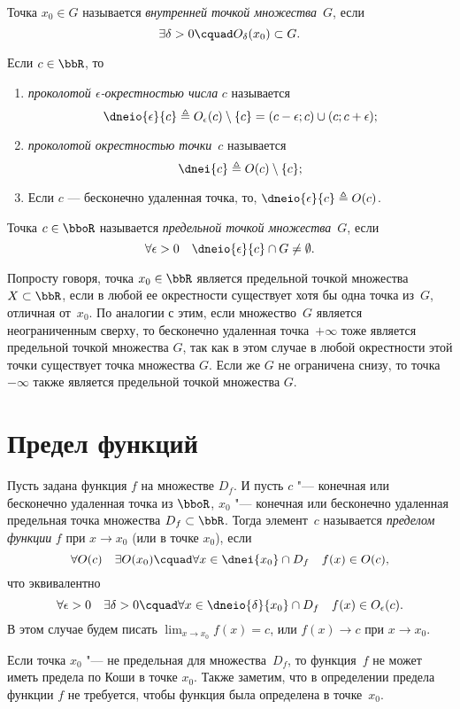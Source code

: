 \begin{defn}
Точка $x_0 \in G$ называется \textit{внутренней точкой множества}~$G$, если 
$$
\exists \delta >0\cquad O_\delta(x_0) \subset G.
$$
\end{defn}

\begin{defn}
Если $c \in \bbR$, то 
\begin{enumerate}[wide, labelwidth=!, labelindent=0pt, nolistsep]
\item
\textit{проколотой $\epsilon$-окрестностью числа} $c$ называется 
$$
\dneio{\epsilon}{c} \triangleq O_\epsilon(c)\setminus\{c\}=(c-\epsilon;c)\cup(c;c+\epsilon);
$$
\item
\textit{проколотой окрестностью точки}~$c$ называется $$\dnei{c} \triangleq O(c)\setminus \{c\};$$
\item[\textbullet]
Если $c$ --- бесконечно удаленная точка, то, $\dneio{\epsilon}{c}\triangleq O (c) $.
\end{enumerate}
\end{defn}

\begin{defn}
Точка $c \in \bboR$ называется \textit{предельной точкой множества}~$G$, если $$\forall \epsilon >0 \quad \dneio{\epsilon}{c} \cap G \ne \emptyset.$$
\end{defn}
Попросту говоря, точка $x_0 \in \bbR$ является предельной точкой множества~$X \subset \bbR$, если в любой ее окрестности существует хотя бы одна точка из~$G$, отличная от~$x_0$. По аналогии с этим, если множество~$G$ является неограниченным сверху, то бесконечно удаленная точка~$+\infty$ тоже является предельной точкой множества $G$, так как в этом случае в любой окрестности этой точки существует точка множества $G$. Если же $G$ не ограничена снизу, то точка $-\infty$ также является предельной точкой множества $G$.

\section{Предел функций}
\begin{defn}\label{df:ch2:predelCaushi}
Пусть задана функция $f$ на множестве $D_f$. И пусть $c$ "--- конечная или бесконечно удаленная точка из $\bboR$, $x_0$ "--- конечная или бесконечно удаленная предельная точка  множества $D_f \subset \bbR$. Тогда элемент~$c$ называется \textit{пределом функции} $f$ при $x \to x_0$ (или в точке $x_0$), если
$$
\forall O(c)\quad \exists O(x_0)\cquad \forall x \in \dnei{x_0}\cap D_f\quad f(x) \in O(c),
$$  
что эквивалентно
$$
\forall \epsilon > 0\quad \exists \delta >0\cquad \forall x \in \dneio{\delta}{x_0} \cap D_f\quad f(x) \in O_\epsilon (c). 
$$
В этом случае будем писать $\lim_{x \to x_0}\limits f(x) = c$, или $f(x)\to c$ при $x \to x_0$.
\end{defn}
Если точка $x_0$ "--- не предельная для множества~$D_f$, то функция~$f$ не может иметь предела по Коши в точке $x_0$. Также заметим, что в определении предела функции $f$ не требуется, чтобы функция была определена в точке~$x_0$.

